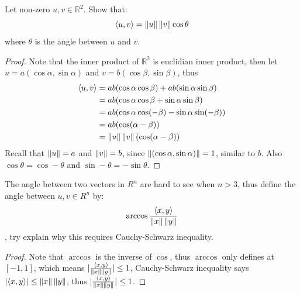 \documentclass[../main.tex]{subfiles}
\begin{document}
\begin{exercise}
  Let non-zero $u, v \in \mathbb{R}^2$. Show that:
  \[
  \langle u , v\rangle = \left\Vert u \right\Vert \left\Vert v \right\Vert \cos \theta
  \]
  where $\theta$ is the angle between $u$ and $v$.
\end{exercise}
\begin{proof}
  Note that the inner product of $\mathbb{R}^2$ is euclidian inner product,
  then let $u = a (\cos \alpha, \sin \alpha)$ and $v = b (\cos \beta, \sin \beta)$,
  thus
  \begin{align*}
    \langle u , v\rangle &= ab (\cos \alpha \cos \beta) + ab (\sin \alpha \sin \beta) \\
              &= ab (\cos \alpha \cos \beta + \sin \alpha \sin \beta) \\
              &= ab (\cos \alpha \cos (- \beta) - \sin \alpha \sin (- \beta)) \\
              &= ab (\cos (\alpha - \beta)) \\
              &= \left\Vert u \right\Vert \left\Vert v \right\Vert (\cos (\alpha - \beta)) \\
  \end{align*}
  Recall that $\left\Vert u \right\Vert = a$ and $\left\Vert v \right\Vert = b$, since $\left\Vert (\cos \alpha, \sin \alpha) \right\Vert = 1$,
  similar to $b$. Also $\cos \theta = \cos - \theta$ and $\sin - \theta = - \sin \theta$.
\end{proof}

\begin{exercise}
  The angle between two vectors in $R^n$ are hard to see when $n > 3$, thus define the angle between $u, v \in R^n$
  by:
  \[
  \arccos \frac{\langle x , y\rangle}{\left\Vert x \right\Vert\left\Vert y \right\Vert}
  \],
  try explain why this requires Cauchy-Schwarz inequality.
\end{exercise}
\begin{proof}
  Note that $\arccos$ is the inverse of $\cos$, thus $\arccos$ only defines
  at $[ -1 , 1 ]$, which means $|\frac{\langle x , y\rangle}{\left\Vert x \right\Vert\left\Vert y \right\Vert}| \le 1$,
  Cauchy-Schwarz inequality says $|\langle x , y\rangle| \le \left\Vert x \right\Vert\left\Vert y \right\Vert$, thus $|\frac{\langle x , y\rangle}{\left\Vert x \right\Vert\left\Vert y \right\Vert}| \le 1$.
\end{proof}
\end{document}
